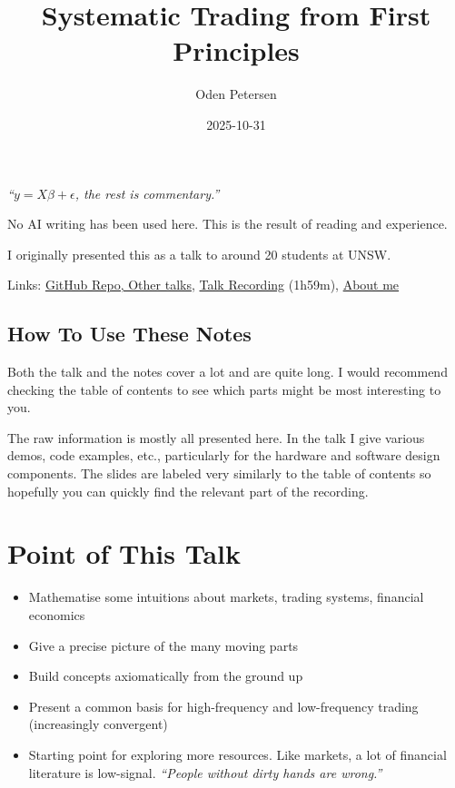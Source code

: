 \documentclass{article}
\title[\texttt{/trading-presentation}]{Systematic Trading from First Principles}
\author[\texttt{github.com/odenpetersen}]{Oden Petersen}
\date{2025-10-31}
\begin{document}
\maketitle
\begin{center}
	\textit{``$y=X\beta+\epsilon$, the rest is commentary.''}
\end{center}

No AI writing has been used here. This is the result of reading and experience.

I originally presented this as a talk to around 20 students at UNSW.

Links: \textcolor{blue}{\href{https://github.com/odenpetersen/trading-presentation}{GitHub Repo, Other talks}}, \textcolor{blue}{\href{https://www.youtube.com/watch?v=hYmR5qk4z8w}{Talk Recording}} (1h59m), \textcolor{blue}{\href{https://linkedin.com/in/oden-petersen}{About me}}

\subsection*{How To Use These Notes}
Both the talk and the notes cover a lot and are quite long. I would recommend checking the table of contents to see which parts might be most interesting to you. 

The raw information is mostly all presented here. In the talk I give various demos, code examples, etc., particularly for the hardware and software design components. The slides are labeled very similarly to the table of contents so hopefully you can quickly find the relevant part of the recording.

\section*{Point of This Talk}
\begin{itemize}
	\item Mathematise some intuitions about markets, trading systems, financial economics
	\item Give a precise picture of the many moving parts
	\item Build concepts axiomatically from the ground up
	\item Present a common basis for high-frequency and low-frequency trading (increasingly convergent)
	\item Starting point for exploring more resources. Like markets, a lot of financial literature is low-signal. \textit{``People without dirty hands are wrong.''}
\end{itemize}
\end{document}

